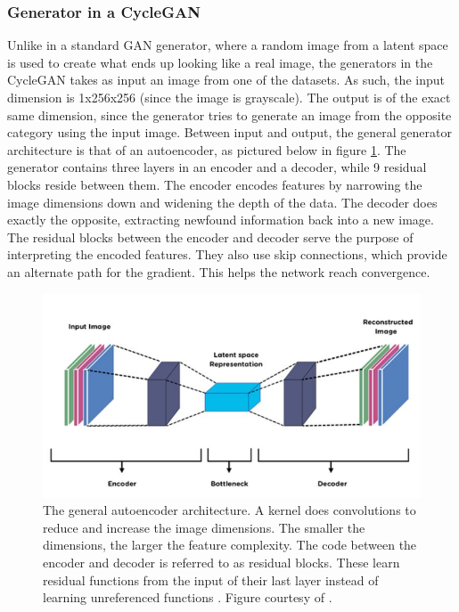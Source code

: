 \documentclass[11pt, fleqn, titlepage]{article}
\newcommand{\1}[1]{\mathds{1}\left[#1\right]}
\begin{document}
\subsubsection{Generator in a CycleGAN}
Unlike in a standard GAN generator, where a random image from a latent space is used to create what ends up looking like a real image, the generators in the CycleGAN takes as input an image from one of the datasets. As such, the input dimension is 1x256x256 (since the image is grayscale). The output is of the exact same dimension, since the generator tries to generate an image from the opposite category using the input image. Between input and output, the general generator architecture is that of an autoencoder, as pictured below in figure \ref{fig:autoencoder}. The generator contains three layers in an encoder and a decoder, while 9 residual blocks reside between them. The encoder encodes features by narrowing the image dimensions down and widening the depth of the data. The decoder does exactly the opposite, extracting newfound information back into a new image. The residual blocks between the encoder and decoder serve the purpose of interpreting the encoded features. They also use skip connections, which provide an alternate path for the gradient. This helps the network reach convergence.

\begin{figure}[H]
	\centering
	\includegraphics[width=0.7\linewidth]{imgs/autoencoder}
	\caption{The general autoencoder architecture. A kernel does convolutions to reduce and increase the image dimensions. The smaller the dimensions, the larger the feature complexity. The code between the encoder and decoder is referred to as residual blocks. These learn residual functions from the input of their last layer instead of learning unreferenced functions \cite{residual_blocks}. Figure courtesy of \cite{autoencoder}.}
	\label{fig:autoencoder}
\end{figure}
\end{document}
